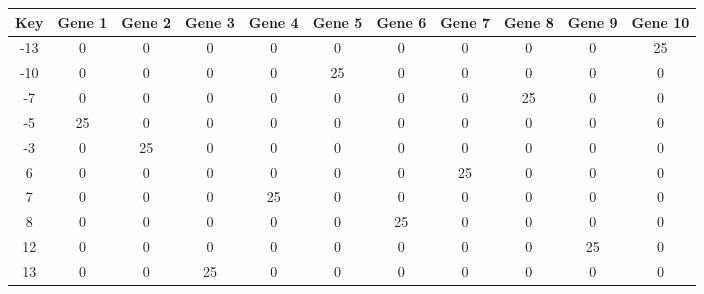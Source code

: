 \begin{tabular}{|c|c|c|c|c|c|c|c|c|c|c|}
\hline
Key & Gene 1 & Gene 2 & Gene 3 & Gene 4 & Gene 5 & Gene 6 & Gene 7 & Gene 8 & Gene 9 & Gene 10 \\
\hline
-13 & 0 & 0 & 0 & 0 & 0 & 0 & 0 & 0 & 0 & 25 \\
-10 & 0 & 0 & 0 & 0 & 25 & 0 & 0 & 0 & 0 & 0 \\
-7 & 0 & 0 & 0 & 0 & 0 & 0 & 0 & 25 & 0 & 0 \\
-5 & 25 & 0 & 0 & 0 & 0 & 0 & 0 & 0 & 0 & 0 \\
-3 & 0 & 25 & 0 & 0 & 0 & 0 & 0 & 0 & 0 & 0 \\
6 & 0 & 0 & 0 & 0 & 0 & 0 & 25 & 0 & 0 & 0 \\
7 & 0 & 0 & 0 & 25 & 0 & 0 & 0 & 0 & 0 & 0 \\
8 & 0 & 0 & 0 & 0 & 0 & 25 & 0 & 0 & 0 & 0 \\
12 & 0 & 0 & 0 & 0 & 0 & 0 & 0 & 0 & 25 & 0 \\
13 & 0 & 0 & 25 & 0 & 0 & 0 & 0 & 0 & 0 & 0 \\
\hline
\end{tabular}